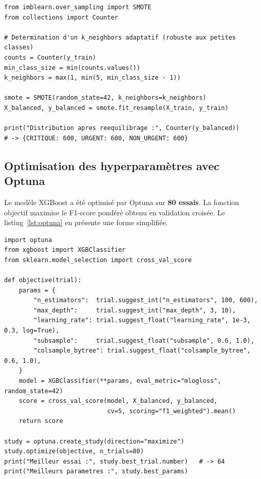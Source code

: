 \begin{listing}[H]
\begin{verbatim}
from imblearn.over_sampling import SMOTE
from collections import Counter

# Determination d'un k_neighbors adaptatif (robuste aux petites classes)
counts = Counter(y_train)
min_class_size = min(counts.values())
k_neighbors = max(1, min(5, min_class_size - 1))

smote = SMOTE(random_state=42, k_neighbors=k_neighbors)
X_balanced, y_balanced = smote.fit_resample(X_train, y_train)

print("Distribution apres reequilibrage :", Counter(y_balanced))
# -> {CRITIQUE: 600, URGENT: 600, NON_URGENT: 600}
\end{verbatim}
\caption{Rééquilibrage des classes par SMOTE avec \texttt{k\_neighbors} adaptatif.}
\label{lst:smote}
\end{listing}

\subsection{Optimisation des hyperparamètres avec Optuna}
Le modèle XGBoost a été optimisé par Optuna sur \textbf{80 essais}. La fonction objectif maximise
le F1-score pondéré obtenu en validation croisée. Le listing~\ref{lst:optuna} en présente une forme
simplifiée.

\begin{listing}[H]
\begin{verbatim}
import optuna
from xgboost import XGBClassifier
from sklearn.model_selection import cross_val_score

def objective(trial):
    params = {
        "n_estimators":  trial.suggest_int("n_estimators", 100, 600),
        "max_depth":     trial.suggest_int("max_depth", 3, 10),
        "learning_rate": trial.suggest_float("learning_rate", 1e-3, 0.3, log=True),
        "subsample":     trial.suggest_float("subsample", 0.6, 1.0),
        "colsample_bytree": trial.suggest_float("colsample_bytree", 0.6, 1.0),
    }
    model = XGBClassifier(**params, eval_metric="mlogloss", random_state=42)
    score = cross_val_score(model, X_balanced, y_balanced,
                            cv=5, scoring="f1_weighted").mean()
    return score

study = optuna.create_study(direction="maximize")
study.optimize(objective, n_trials=80)
print("Meilleur essai :", study.best_trial.number)   # -> 64
print("Meilleurs parametres :", study.best_params)
\end{verbatim}
\caption{Optimisation des hyperparamètres de XGBoost avec Optuna (80 essais).}
\label{lst:optuna}
\end{listing}

